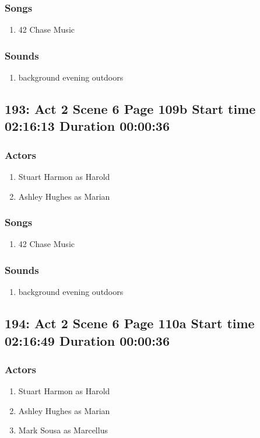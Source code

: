 \subsubsection{Songs}
\begin{enumerate}
\item 42 Chase Music
\end{enumerate}\subsubsection{Sounds}
\begin{enumerate}
\item background evening outdoors
\end{enumerate}
\subsection{193: Act 2 Scene 6 Page 109b Start time 02:16:13 Duration 00:00:36}

\subsubsection{Actors}
\begin{enumerate}
\item Stuart Harmon as Harold
\item Ashley Hughes as Marian
\end{enumerate}

\subsubsection{Songs}
\begin{enumerate}
\item 42 Chase Music
\end{enumerate}\subsubsection{Sounds}
\begin{enumerate}
\item background evening outdoors
\end{enumerate}
\subsection{194: Act 2 Scene 6 Page 110a Start time 02:16:49 Duration 00:00:36}

\subsubsection{Actors}
\begin{enumerate}
\item Stuart Harmon as Harold
\item Ashley Hughes as Marian
\item Mark Sousa as Marcellus
\end{enumerate}

